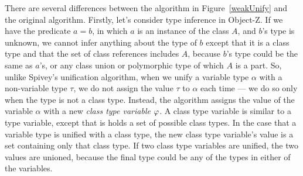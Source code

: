 
There are several differences between the algorithm in
Figure~\ref{weakUnify} and the original algorithm. Firstly, let's
consider type inference in Object-Z. If we have the predicate $a = b$,
in which $a$ is an instance of the class $A$, and $b$'s type is
unknown, we cannot infer anything about the type of $b$ except that it
is a class type and that the set of class references includes $A$,
because $b$'s type could be the same as $a$'s, or any class union or
polymorphic type of which $A$ is a part. So, unlike Spivey's
unification algorithm, when we unify a variable type $\alpha$ with a
non-variable type $\tau$, we do not assign the value $\tau$ to
$\alpha$ each time --- we do so only when the type is not a class
type. Instead, the algorithm assigns the value of the variable
$\alpha$ with a new {\em class type variable} $\varphi$. A class
type variable is similar to a type variable, except that is holds a
set of possible class types. In the case that a variable type is
unified with a class type, the new class type variable's value is a
set containing only that class type. If two class type
variables are unified, the two values are unioned, because the final
type could be any of the types in either of the variables.
  
